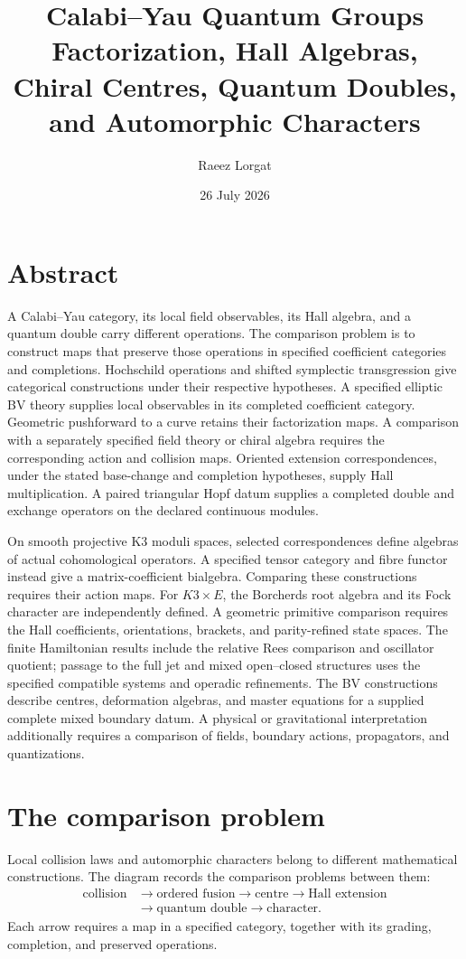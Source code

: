 \documentclass[11pt,twoside,openright]{memoir}
\title{\texorpdfstring{\textbf{Calabi--Yau Quantum Groups}\\[0.55em]\Large Factorization, Hall Algebras, Chiral Centres, Quantum Doubles, and Automorphic Characters}{Calabi--Yau Quantum Groups: Factorization, Hall Algebras, Chiral Centres, Quantum Doubles, and Automorphic Characters}}
\author{Raeez Lorgat}
\date{26 July 2026}
\begin{document}
\frontmatter
\maketitle
\thispagestyle{empty}
\cleardoublepage
\chapter*{Abstract}

A Calabi--Yau category, its local field observables, its Hall algebra, and a quantum double carry different operations. The comparison problem is to construct maps that preserve those operations in specified coefficient categories and completions. Hochschild operations and shifted symplectic transgression give categorical constructions under their respective hypotheses. A specified elliptic BV theory supplies local observables in its completed coefficient category. Geometric pushforward to a curve retains their factorization maps. A comparison with a separately specified field theory or chiral algebra requires the corresponding action and collision maps. Oriented extension correspondences, under the stated base-change and completion hypotheses, supply Hall multiplication. A paired triangular Hopf datum supplies a completed double and exchange operators on the declared continuous modules.

On smooth projective K3 moduli spaces, selected correspondences define algebras of actual cohomological operators. A specified tensor category and fibre functor instead give a matrix-coefficient bialgebra. Comparing these constructions requires their action maps. For $K3\times E$, the Borcherds root algebra and its Fock character are independently defined. A geometric primitive comparison requires the Hall coefficients, orientations, brackets, and parity-refined state spaces. The finite Hamiltonian results include the relative Rees comparison and oscillator quotient; passage to the full jet and mixed open--closed structures uses the specified compatible systems and operadic refinements. The BV constructions describe centres, deformation algebras, and master equations for a supplied complete mixed boundary datum. A physical or gravitational interpretation additionally requires a comparison of fields, boundary actions, propagators, and quantizations.

\chapter*{The comparison problem}
Local collision laws and automorphic characters belong to different mathematical constructions. The diagram records the comparison problems between them:
\[
\begin{aligned}
\text{collision}&\longrightarrow\text{ordered fusion}\longrightarrow\text{centre}\longrightarrow\text{Hall extension}\\
&\longrightarrow\text{quantum double}\longrightarrow\text{character}.
\end{aligned}
\]
Each arrow requires a map in a specified category, together with its grading, completion, and preserved operations.
\end{document}
